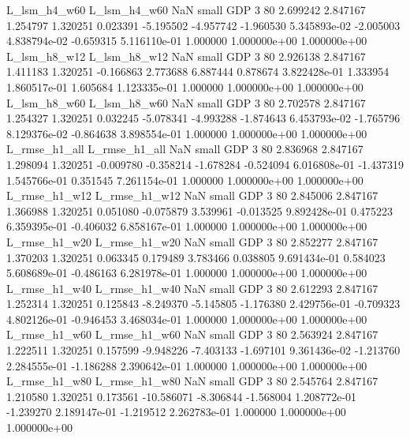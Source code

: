   L_lsm_h4_w60   L_lsm_h4_w60                   NaN      small      GDP                 3 80 2.699242       2.847167 1.254797       1.320251    0.023391     -5.195502     -4.957742    -1.960530   5.345893e-02 -2.005003 4.838794e-02    -0.659315   5.116110e-01            1.000000    1.000000e+00        1.000000e+00
  L_lsm_h8_w12   L_lsm_h8_w12                   NaN      small      GDP                 3 80 2.926138       2.847167 1.411183       1.320251   -0.166863      2.773688      6.887444     0.878674   3.822428e-01  1.333954 1.860517e-01     1.605684   1.123335e-01            1.000000    1.000000e+00        1.000000e+00
  L_lsm_h8_w60   L_lsm_h8_w60                   NaN      small      GDP                 3 80 2.702578       2.847167 1.254327       1.320251    0.032245     -5.078341     -4.993288    -1.874643   6.453793e-02 -1.765796 8.129376e-02    -0.864638   3.898554e-01            1.000000    1.000000e+00        1.000000e+00
 L_rmse_h1_all  L_rmse_h1_all                   NaN      small      GDP                 3 80 2.836968       2.847167 1.298094       1.320251   -0.009780     -0.358214     -1.678284    -0.524094   6.016808e-01 -1.437319 1.545766e-01     0.351545   7.261154e-01            1.000000    1.000000e+00        1.000000e+00
 L_rmse_h1_w12  L_rmse_h1_w12                   NaN      small      GDP                 3 80 2.845006       2.847167 1.366988       1.320251    0.051080     -0.075879      3.539961    -0.013525   9.892428e-01  0.475223 6.359395e-01    -0.406032   6.858167e-01            1.000000    1.000000e+00        1.000000e+00
 L_rmse_h1_w20  L_rmse_h1_w20                   NaN      small      GDP                 3 80 2.852277       2.847167 1.370203       1.320251    0.063345      0.179489      3.783466     0.038805   9.691434e-01  0.584023 5.608689e-01    -0.486163   6.281978e-01            1.000000    1.000000e+00        1.000000e+00
 L_rmse_h1_w40  L_rmse_h1_w40                   NaN      small      GDP                 3 80 2.612293       2.847167 1.252314       1.320251    0.125843     -8.249370     -5.145805    -1.176380   2.429756e-01 -0.709323 4.802126e-01    -0.946453   3.468034e-01            1.000000    1.000000e+00        1.000000e+00
 L_rmse_h1_w60  L_rmse_h1_w60                   NaN      small      GDP                 3 80 2.563924       2.847167 1.222511       1.320251    0.157599     -9.948226     -7.403133    -1.697101   9.361436e-02 -1.213760 2.284555e-01    -1.186288   2.390642e-01            1.000000    1.000000e+00        1.000000e+00
 L_rmse_h1_w80  L_rmse_h1_w80                   NaN      small      GDP                 3 80 2.545764       2.847167 1.210580       1.320251    0.173561    -10.586071     -8.306844    -1.568004   1.208772e-01 -1.239270 2.189147e-01    -1.219512   2.262783e-01            1.000000    1.000000e+00        1.000000e+00
